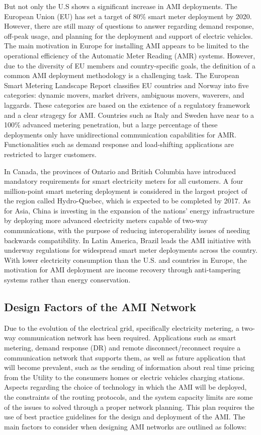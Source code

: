 \documentclass[11pt,draftclsnofoot,onecolumn]{IEEEtran}
\begin{document}
But not only the U.S shows a significant increase in AMI deployments. The European Union (EU) has set a target of 80\% smart meter deployment by 2020. However, there are still many of questions to answer regarding demand response, off-peak usage, and planning for the deployment and support of electric vehicles. The main motivation in Europe for installing AMI appears to be limited to the operational efficiency of the Automatic Meter Reading (AMR) systems. However, due to the diversity of EU members and country-specific goals, the definition of a common AMI deployment methodology is a challenging task. The European Smart Metering Landscape Report \cite{SmartRegions2012} classifies EU countries and Norway into five categories: dynamic movers, market drivers, ambiguous movers, waverers, and laggards. These categories are based on the existence of a regulatory framework and a clear stragegy for AMI. Countries such as Italy and Sweden have near to a 100\% advanced metering penetration, but a large percentage of these deployments only have unidirectional communication capabilities for AMR. Functionalities such as demand response and load-shifting applications are restricted to larger customers. 

In Canada, the provinces of Ontario and British Columbia have introduced mandatory requirements for smart electricity meters for all customers. A four million-point smart metering deployment is considered in the largest project of the region called Hydro-Quebec, which is expected to be completed by 2017. As for Asia, China is investing in the expansion of the nations’ energy infrastructure by deploying more advanced electricity meters capable of two-way communications, with the purpose of reducing interoperability issues of needing backwards compatibility. In Latin America, Brazil leads the AMI initiative with underway regulations for widespread smart meter deployments across the country. With lower electricity consumption than the U.S. and countries in Europe, the motivation for AMI deployment are income recovery through anti-tampering systems rather than energy conservation.  


\subsection{Design Factors of the AMI Network}\label{designFactors}

Due to the evolution of the electrical grid, specifically electricity metering, a two-way communication network has been required. Applications such as smart metering, demand response (DR) and remote disconnect/reconnect require a communication network that supports them, as well as future application that will become prevalent, such as the sending of information about real time pricing from the Utility to the consumers homes or electric vehicles charging stations.  
Aspects regarding the choice of technology in which the AMI will be deployed, the constraints of the routing protocols, and the system capacity limits are some of the issues to solved through a proper network planning. This plan requires the use of best practice guidelines for the design and deployment of the AMI. The main factors to consider when designing AMI networks are outlined as follows:
\end{document}
